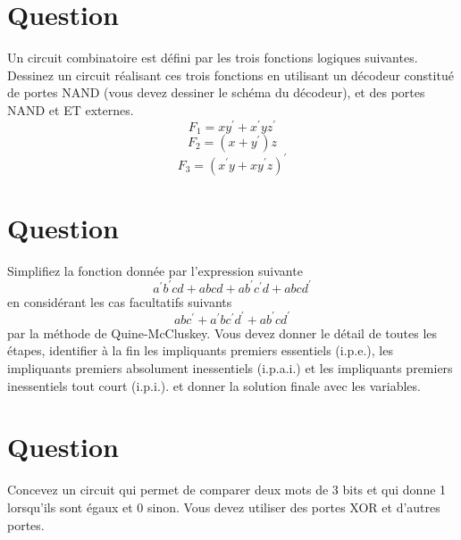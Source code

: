 \documentclass[letter, oneside]{book}
\begin{document}
\section*{Question}
\label{sec:orge9072f5}
Un circuit combinatoire est défini par les trois fonctions logiques
  suivantes. Dessinez un circuit réalisant ces trois fonctions en
  utilisant un décodeur constitué de portes NAND (vous devez dessiner
  le schéma du décodeur), et des portes NAND et ET
  externes.
  $$
     F_1  = x y^{\prime} + x^{\prime}y
    z^{\prime} 
    $$
  $$
    F_2  =  (x + y^{\prime})z 
    $$
  $$ F_3  =  (x^{\prime}
    y + x y^{\prime} z)^{\prime}
    $$

\section*{Question}
\label{sec:org4e6e33a}
Simplifiez la fonction donnée par l'expression suivante
  $$
    a^{\prime} b^{\prime} c d + a b c d + a b^{\prime} c^{\prime} d +
	a b c d^{\prime}
    $$
  en considérant les cas facultatifs suivants
  $$
    a b c^{\prime} + a^{\prime} b c^{\prime} d^{\prime} + a b^{\prime}
	c d^{\prime}
    $$
  par la méthode de Quine-McCluskey. Vous devez
  donner le détail de toutes les étapes, identifier à la fin les
  impliquants premiers essentiels (i.p.e.), les impliquants premiers
  absolument inessentiels (i.p.a.i.) et les impliquants premiers
  inessentiels tout court (i.p.i.). et donner la solution finale avec
  les variables.

\section*{Question}
\label{sec:org2e67a52}
Concevez un circuit qui permet de comparer deux mots de 3 bits et qui
  donne 1 lorsqu'ils sont égaux et 0 sinon. Vous devez utiliser des
  portes XOR et d'autres portes.
\end{document}
